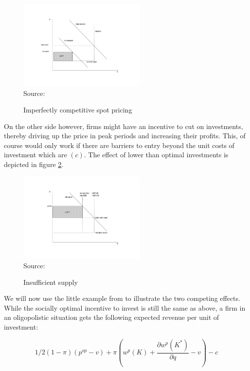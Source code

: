 \begin{figure}[h]
\centering
\caption{Imperfectly competitive spot pricing}
\includegraphics[width=2.5in]{capacity/imperfect_spot_pricing}
      \label{peak_load_toohigh}  
\\          
\scriptsize Source: \cite{Fehr1995}
\end{figure}

On the other side however, firms might have an incentive to cut on investments, thereby driving up the price in peak periods and increasing their profits. This, of course would only work if there are barriers to entry beyond the unit costs of investment which are $(c)$. The effect of lower than optimal investments is depicted in figure \ref{peak_load_insufficient}.

\begin{figure}[h]
\centering
\caption{Insufficient supply}
\includegraphics[width=2.5in]{capacity/imperfect_spot_pricing2}
      \label{peak_load_insufficient}  
\\          
\scriptsize Source: \cite{Fehr1995}
\end{figure}

We will now use the little example from \cite{Fehr1995} to illustrate the two competing effects.
While the socially optimal incentive to invest is still the same as above, a firm in an oligopolistic situation gets the following expected revenue per unit of investment:

\begin{equation}
	1/2 (1-\pi) (p^{op}-v) + \pi (w^p(K)+\frac{\partial w^p(K^*)}{\partial q}-v) - c
\end{equation}

